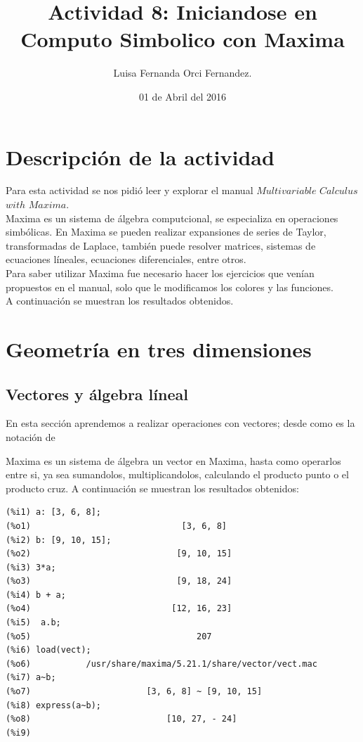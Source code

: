 \documentclass[12pt,letterpaper]{article}
\begin{document}
\title{Actividad 8: Iniciandose en Computo Simbolico con Maxima}
\author{Luisa Fernanda Orci Fernandez.}
\date{01 de Abril del 2016}

\maketitle


\section*{Descripción de la actividad}

Para esta actividad se nos pidió leer y explorar el manual $Multivariable$ $Calculus$ $with$ $Maxima$\cite{2}.  \\
 
Maxima es un sistema de álgebra computcional, se especializa en operaciones simbólicas. \cite{1} En Maxima se pueden realizar expansiones de series de Taylor, transformadas de Laplace, también puede resolver matrices, sistemas de ecuaciones líneales, ecuaciones diferenciales, entre otros. \\
Para saber utilizar Maxima fue necesario hacer los ejercicios que venían propuestos en el manual, solo que le modificamos los colores y las funciones. \\

A continuación se muestran los resultados obtenidos.

\section{Geometría en tres dimensiones}

\subsection{Vectores y álgebra líneal}
En esta sección aprendemos a realizar operaciones con vectores; desde como es la notación de
 
Maxima es un sistema de álgebra un vector en Maxima, hasta como operarlos entre si, ya sea sumandolos, multiplicandolos, calculando el producto punto o el producto cruz. A continuación se muestran los resultados obtenidos:

\begin{verbatim}
(%i1) a: [3, 6, 8];
(%o1)                              [3, 6, 8]
(%i2) b: [9, 10, 15];
(%o2)                             [9, 10, 15]
(%i3) 3*a;
(%o3)                             [9, 18, 24]
(%i4) b + a;
(%o4)                            [12, 16, 23]
(%i5)  a.b;
(%o5)                                 207
(%i6) load(vect);
(%o6)           /usr/share/maxima/5.21.1/share/vector/vect.mac
(%i7) a~b;
(%o7)                       [3, 6, 8] ~ [9, 10, 15]
(%i8) express(a~b);
(%o8)                           [10, 27, - 24]
(%i9) 
\end{verbatim}
\end{document}
